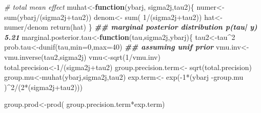\documentclass[
]{book}
\newenvironment{Shaded}{\begin{snugshade}}{\end{snugshade}}
\newcommand{\AttributeTok}[1]{\textcolor[rgb]{0.77,0.63,0.00}{#1}}
\newcommand{\CommentTok}[1]{\textcolor[rgb]{0.56,0.35,0.01}{\textit{#1}}}
\newcommand{\ControlFlowTok}[1]{\textcolor[rgb]{0.13,0.29,0.53}{\textbf{#1}}}
\newcommand{\DecValTok}[1]{\textcolor[rgb]{0.00,0.00,0.81}{#1}}
\newcommand{\DocumentationTok}[1]{\textcolor[rgb]{0.56,0.35,0.01}{\textbf{\textit{#1}}}}
\newcommand{\FunctionTok}[1]{\textcolor[rgb]{0.00,0.00,0.00}{#1}}
\newcommand{\NormalTok}[1]{#1}
\newcommand{\OtherTok}[1]{\textcolor[rgb]{0.56,0.35,0.01}{#1}}
\newcommand{\SpecialCharTok}[1]{\textcolor[rgb]{0.00,0.00,0.00}{#1}}
\theoremstyle{definition}
\theoremstyle{definition}
\theoremstyle{definition}
\theoremstyle{definition}
\theoremstyle{remark}
\begin{document}
\begin{Shaded}
\begin{Highlighting}[]
  \CommentTok{\# total mean effect}
\NormalTok{  muhat}\OtherTok{\textless{}{-}}\ControlFlowTok{function}\NormalTok{(ybarj, sigma2j,tau2)\{}
\NormalTok{    numer}\OtherTok{\textless{}{-}} \FunctionTok{sum}\NormalTok{(ybarj}\SpecialCharTok{/}\NormalTok{(sigma2j}\SpecialCharTok{+}\NormalTok{tau2))}
\NormalTok{    denom}\OtherTok{\textless{}{-}} \FunctionTok{sum}\NormalTok{( }\DecValTok{1}\SpecialCharTok{/}\NormalTok{(sigma2j}\SpecialCharTok{+}\NormalTok{tau2))}
\NormalTok{    hat}\OtherTok{\textless{}{-}}\NormalTok{ numer}\SpecialCharTok{/}\NormalTok{denom}
    \FunctionTok{return}\NormalTok{(hat)}
\NormalTok{  \}}
    \DocumentationTok{\#\# marginal posterior distribution p(tau| y)  5.21}
\NormalTok{  marginal.posterior.tau}\OtherTok{\textless{}{-}}\ControlFlowTok{function}\NormalTok{(tau,sigma2j,ybarj)\{}
\NormalTok{    tau2}\OtherTok{\textless{}{-}}\NormalTok{tau}\SpecialCharTok{\^{}}\DecValTok{2}
\NormalTok{    prob.tau}\OtherTok{\textless{}{-}}\FunctionTok{dunif}\NormalTok{(tau,}\AttributeTok{min=}\DecValTok{0}\NormalTok{,}\AttributeTok{max=}\DecValTok{40}\NormalTok{) }\DocumentationTok{\#\# assuming unif prior}
\NormalTok{    vmu.inv}\OtherTok{\textless{}{-}}\FunctionTok{vmu.inverse}\NormalTok{(tau2,sigma2j)}
\NormalTok{    vmu}\OtherTok{\textless{}{-}}\FunctionTok{sqrt}\NormalTok{(}\DecValTok{1}\SpecialCharTok{/}\NormalTok{vmu.inv)}
\NormalTok{    total.precision}\OtherTok{\textless{}{-}}\DecValTok{1}\SpecialCharTok{/}\NormalTok{(sigma2j}\SpecialCharTok{+}\NormalTok{tau2)}
\NormalTok{    group.precision.term}\OtherTok{\textless{}{-}} \FunctionTok{sqrt}\NormalTok{(total.precision)}
\NormalTok{    group.mu}\OtherTok{\textless{}{-}}\FunctionTok{muhat}\NormalTok{(ybarj,sigma2j,tau2)}
\NormalTok{    exp.term}\OtherTok{\textless{}{-}} \FunctionTok{exp}\NormalTok{(}\SpecialCharTok{{-}}\DecValTok{1}\SpecialCharTok{*}\NormalTok{(ybarj }\SpecialCharTok{{-}}\NormalTok{group.mu )}\SpecialCharTok{\^{}}\DecValTok{2}\SpecialCharTok{/}\NormalTok{(}\DecValTok{2}\SpecialCharTok{*}\NormalTok{(sigma2j}\SpecialCharTok{+}\NormalTok{tau2)))}

\NormalTok{    group.prod}\OtherTok{\textless{}{-}}\FunctionTok{prod}\NormalTok{( group.precision.term}\SpecialCharTok{*}\NormalTok{exp.term)}
    

\end{Highlighting}
\end{Shaded}
\end{document}
